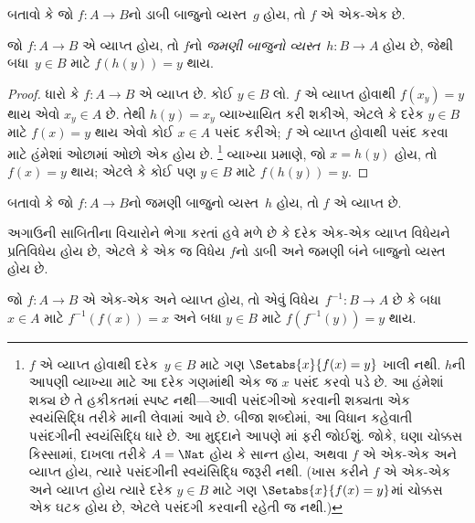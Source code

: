 \begin{prob}
બતાવો કે જો $f\colon A \to B$નો ડાબી બાજુનો
વ્યસ્ત~$g$ હોય, તો $f$ એ એક-એક છે.
\end{prob}

\begin{prop}
જો $f\colon A \to B$ એ વ્યાપ્ત હોય, તો
$f$નો \emph{જમણી બાજુનો વ્યસ્ત}~$h\colon B \to A$
હોય છે, જેથી બધા~$y \in B$ માટે $f(h(y)) =
y$ થાય.
\end{prop}

\begin{proof}
ધારો કે $f\colon A \to B$ એ વ્યાપ્ત છે.
કોઈ $y \in
B$ લો. $f$ એ વ્યાપ્ત હોવાથી
$f(x_y)
= y$ થાય એવો $x_y \in A$ છે.
તેથી $h(y) = x_y$ વ્યાખ્યાયિત કરી શકીએ, એટલે કે
દરેક $y \in B$ માટે $f(x) = y$ થાય એવો કોઈ
$x \in A$ પસંદ કરીએ; $f$ એ વ્યાપ્ત
હોવાથી પસંદ કરવા માટે હંમેશાં ઓછામાં ઓછો એક હોય છે.
\footnote{$f$ એ વ્યાપ્ત હોવાથી દરેક~$y \in B$
માટે ગણ $\Setabs{x}{f(x) = y}$ ખાલી નથી.
$h$ની આપણી વ્યાખ્યા માટે આ દરેક ગણમાંથી એક જ $x$
પસંદ કરવો પડે છે. આ હંમેશાં શક્ય છે તે હકીકતમાં
સ્પષ્ટ નથી---આવી પસંદગીઓ કરવાની શક્યતા એક
સ્વયંસિદ્ધિ તરીકે માની લેવામાં આવે છે.
બીજા શબ્દોમાં, આ વિધાન કહેવાતી પસંદગીની સ્વયંસિદ્ધિ
ધારે છે. આ મુદ્દાને આપણે
માં ફરી જોઈશું.
જોકે, ઘણા ચોક્કસ કિસ્સામાં, દાખલા તરીકે $A = \Nat$
હોય કે સાન્ત હોય, અથવા $f$ એ એક-એક અને વ્યાપ્ત હોય,
ત્યારે પસંદગીની સ્વયંસિદ્ધિ જરૂરી નથી. (ખાસ કરીને
$f$ એ એક-એક અને વ્યાપ્ત હોય ત્યારે દરેક $y \in B$
માટે ગણ $\Setabs{x}{f(x) = y}$માં ચોક્કસ એક
ઘટક હોય છે, એટલે પસંદગી કરવાની રહેતી જ નથી.)}
વ્યાખ્યા પ્રમાણે, જો $x = h(y)$ હોય,
તો $f(x) = y$ થાય; એટલે કે કોઈ પણ $y \in B$
માટે $f(h(y)) = y$.
\end{proof}

\begin{prob}
બતાવો કે જો $f\colon A \to B$નો જમણી બાજુનો
વ્યસ્ત~$h$ હોય, તો $f$ એ વ્યાપ્ત છે.
\end{prob}

\begin{explain}
અગાઉની સાબિતીના વિચારોને ભેગા કરતાં હવે મળે છે કે
દરેક એક-એક વ્યાપ્ત વિધેયને પ્રતિવિધેય હોય છે, એટલે કે
એક જ વિધેય $f$નો ડાબી અને જમણી બંને બાજુનો વ્યસ્ત હોય છે.
\end{explain}

\begin{prop}
જો $f\colon A \to B$ એ એક-એક અને વ્યાપ્ત હોય, તો એવું
વિધેય~$f^{-1}\colon B \to A$ છે કે બધા $x \in A$
માટે $f^{-1}(f(x)) = x$ અને બધા $y \in B$
માટે $f(f^{-1}(y)) = y$ થાય.
\end{prop}

